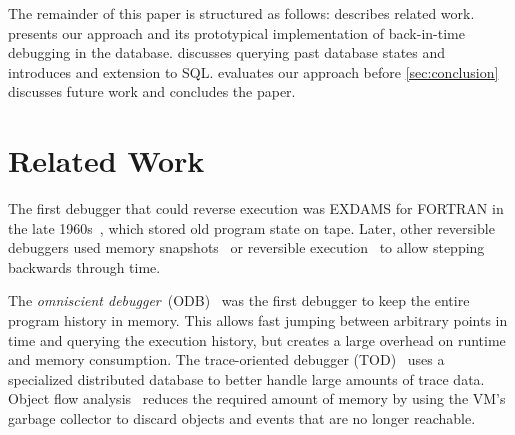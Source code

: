 \documentclass[english,conference]{IEEEtran}
\begin{document}
The remainder of this paper is structured as follows:
 describes related work. 
 presents our approach and its prototypical implementation of back-in-time debugging in the database.
 discusses querying past database states and introduces and extension to SQL.
 evaluates our approach before \cref{sec:conclusion} discusses future work and concludes the paper.


\section{Related Work}
\label{sec:relatedWork}

The first debugger that could reverse execution was EXDAMS for FORTRAN in the late 1960s~\cite{balzer_exdams:_1969}, which stored old program state on tape.
Later, other reversible debuggers used memory snapshots~\cite{feldman_igor:_1988} or reversible execution~\cite{lieberman1997zstep} to allow stepping backwards through time.

The \emph{omniscient debugger}~(ODB)~\cite{lewis_debugging_2003} was the first debugger to keep the entire program history in memory.
This allows fast jumping between arbitrary points in time and querying the execution history, but creates a large overhead on runtime and memory consumption.
The trace-oriented  debugger (TOD)~\cite{pothier_scalable_2007} uses a specialized distributed database to better handle large amounts of trace data.
Object  flow  analysis~\cite{lienhard_practical_2008} reduces the required amount of memory by using the VM's garbage collector to discard objects and events that are no longer reachable.

\cite{perscheid2013}

\end{document}
